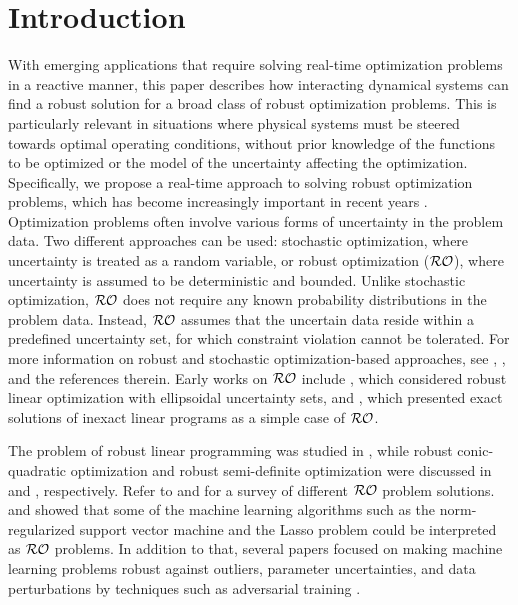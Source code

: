 \documentclass[journal,twoside,web]{ieeecolor}
\begin{document}
\section{Introduction}

With emerging applications that require solving real-time optimization problems in a reactive manner, this paper describes how interacting dynamical systems can find a robust solution for a broad class of robust optimization problems. This is particularly relevant in situations where physical systems must be steered towards optimal operating conditions, without prior knowledge of the functions to be optimized or the model of the uncertainty affecting the optimization. Specifically, we propose a real-time approach to solving robust optimization problems, which has become increasingly important in recent years \cite{he2022}. Optimization problems often involve various forms of uncertainty in the problem data. Two different approaches can be used: stochastic optimization, where uncertainty is treated as a random variable, or robust optimization (${\cal RO}$), where uncertainty is assumed to be deterministic and bounded. Unlike stochastic optimization, ${\cal RO}$ does not require any known probability distributions in the problem data. Instead, ${\cal RO}$ assumes that the uncertain data reside within a predefined uncertainty set, for which constraint violation cannot be tolerated. For more information on robust and stochastic optimization-based approaches, see \cite{bental2009}, \cite{bertsimas2011}, and the references therein. Early works on ${\cal RO}$ include \cite{soyster1976}, which considered robust linear optimization with ellipsoidal uncertainty sets, and \cite{falk1976}, which presented exact solutions of inexact linear programs as a simple case of ${\cal RO}$.

The problem of robust linear programming was studied in \cite{bental1999}, while robust conic-quadratic optimization and robust semi-definite optimization were discussed in \cite{bental2002} and \cite{bental1998}, respectively. Refer to \cite{bertsimas2011} and \cite{beyer2007} for a survey of different ${\cal RO}$ problem solutions. 
\cite{xu2009} and \cite{xu2010} showed that some of the machine learning algorithms such as the norm-regularized support vector machine and the Lasso problem could be interpreted as ${\cal RO}$ problems. In addition to that, several papers focused on making machine learning problems robust against outliers, parameter uncertainties, and data perturbations by techniques such as adversarial training \cite{lanckriet2003, bhattacharyya2004a, bhattacharyya2004b, trafalis2007, namkoong2016, sinha2018, esfandiari2019}. 
\end{document}
